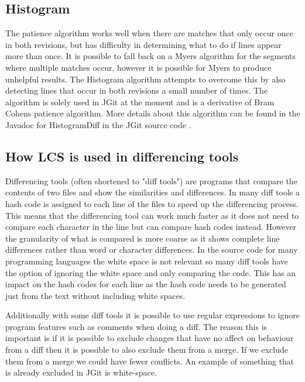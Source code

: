 \subsection{Histogram}
The patience algorithm works well when there are matches that only occur once in both revisions, but has difficulty in determining what to do if lines appear more than once.
It is possible to fall back on a Myers algorithm for the segments where multiple matches occur, however it is possible for Myers to produce unhelpful results. 
The Histogram algorithm attempts to overcome this by also detecting lines that occur in both revisions a small number of times.
The algorithm is solely used in JGit at the moment and is a derivative of Bram Cohens patience algorithm. 
More details about this algorithm can be found in the Javadoc for HistogramDiff in the JGit source code \cite{Foundation2014}. 



\subsection{How LCS is used in differencing tools}
Differencing tools (often shortened to "diff tools") are programs that compare the contents of two files and show the similarities and differences.
In many diff tools a hash code is assigned to each line of the files to speed up the differencing process.
This means that the differencing tool can work much faster as it does not need to compare each character in the line but can compare hash codes instead.
However the granularity of what is compared is more coarse as it shows complete line differences rather than word or character differences. 
In the source code for many programming languages the white space is not relevant so many diff tools have the option of ignoring the white space and only comparing the code.
This has an impact on the hash codes for each line as the hash code needs to be generated just from the text without including white spaces.

Additionally with some diff tools it is possible to use regular expressions to ignore program features such as comments when doing a diff.  The reason this is important is if it is possible to exclude changes that have no affect on behaviour from a diff then it is possible to also exclude them from a merge.  If we exclude them from a merge we could have fewer conflicts. An example of something that is already excluded in JGit is white-space. 

